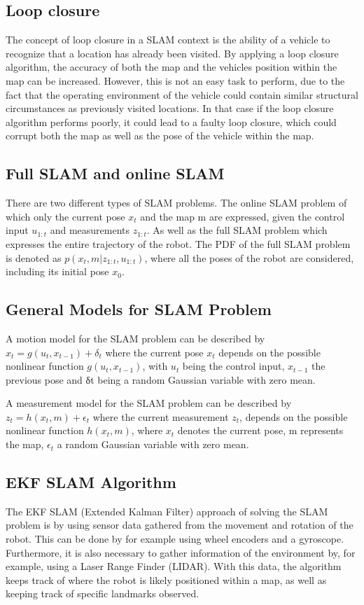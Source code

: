 \subsection{Loop closure}
The concept of loop closure in a SLAM context is the ability of a vehicle to recognize that a location has already been visited. By applying a loop closure algorithm, the accuracy of both the map and the vehicles position within the map can be increased. \cite{yifan2016} However, this is not an easy task to perform, due to the fact that the operating environment of the vehicle could contain similar structural circumstances as previously visited locations. In that case if the loop closure algorithm performs poorly, it could lead to a faulty loop closure, which could corrupt both the map as well as the pose of the vehicle within the map. \cite{yifan2016}

\subsection{Full SLAM and online SLAM}
There are two different types of SLAM problems. The online SLAM problem of which only the current pose $x_{t}$ and the map m are expressed, given the control input $u_{1:t}$ and measurements $z_{1:t}$. As well as the full SLAM problem which expresses the entire trajectory of the robot. The PDF of the full SLAM problem is denoted as $p(x_{t} , m|z_{1:t} , u_{1:t} )$, where all the poses of the robot are considered, including its initial pose $x_{0}$. \cite{curotto2016}

\subsection{General Models for SLAM Problem}
A motion model for the SLAM problem can be described by
$x_{t} =g(u_{t},x_{t−1})+ \delta_{t}$
where the current pose $x_{t}$ depends on the possible nonlinear function $g(u_{t}, x_{t−1})$, with $u_{t}$ being the control input, $x_{t-1}$ the previous pose and δt being a random Gaussian variable with zero mean.\cite{curotto2016}

A measurement model for the SLAM problem can be described by
$z_{t}=h(x_{t},m)+\epsilon_{t}$
where the current measurement $z_{t}$, depends on the possible nonlinear function $h(x_{t},m)$, where $x_{t}$ denotes the current pose, m represents the map, $\epsilon_{t}$ a random Gaussian variable with zero mean.\cite{curotto2016}

\subsection{EKF SLAM Algorithm}
The EKF SLAM (Extended Kalman Filter) approach of solving the SLAM problem is by using sensor data gathered from the movement and rotation of the robot. This can be done by for example using wheel encoders and a gyroscope. Furthermore, it is also necessary to gather information of the environment by, for example, using a Laser Range Finder (LIDAR). With this data, the algorithm keeps track of where the robot is likely positioned within a map, as well as keeping track of specific landmarks observed.\cite{mit2017}

